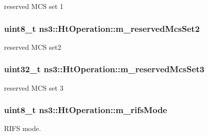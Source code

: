 reserved M\+CS set 1 

\subsubsection[{\texorpdfstring{m\+\_\+reserved\+Mcs\+Set2}{m_reservedMcsSet2}}]{\setlength{\rightskip}{0pt plus 5cm}uint8\+\_\+t ns3\+::\+Ht\+Operation\+::m\+\_\+reserved\+Mcs\+Set2\hspace{0.3cm}{\ttfamily [private]}}\hypertarget{classns3_1_1HtOperation_aba163dff5b285a7186a43754f894a659}{}\label{classns3_1_1HtOperation_aba163dff5b285a7186a43754f894a659}


reserved M\+CS set2 

\subsubsection[{\texorpdfstring{m\+\_\+reserved\+Mcs\+Set3}{m_reservedMcsSet3}}]{\setlength{\rightskip}{0pt plus 5cm}uint32\+\_\+t ns3\+::\+Ht\+Operation\+::m\+\_\+reserved\+Mcs\+Set3\hspace{0.3cm}{\ttfamily [private]}}\hypertarget{classns3_1_1HtOperation_ad9fcc28d4a45ae4e8b2b07bd560b3c28}{}\label{classns3_1_1HtOperation_ad9fcc28d4a45ae4e8b2b07bd560b3c28}


reserved M\+CS set 3 

\subsubsection[{\texorpdfstring{m\+\_\+rifs\+Mode}{m_rifsMode}}]{\setlength{\rightskip}{0pt plus 5cm}uint8\+\_\+t ns3\+::\+Ht\+Operation\+::m\+\_\+rifs\+Mode\hspace{0.3cm}{\ttfamily [private]}}\hypertarget{classns3_1_1HtOperation_a4984fc439a00d647d482f0d1440c7649}{}\label{classns3_1_1HtOperation_a4984fc439a00d647d482f0d1440c7649}


R\+I\+FS mode. 


